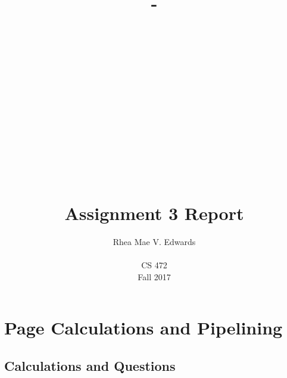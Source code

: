 \documentclass[letterpaper,10pt,onecolumn,compsoc]{IEEEtran}
\title{-\\ ~ \\ ~ \\ ~ \\ ~ \\ ~ \\ ~ \\ ~ \\ ~ \\ Assignment 3 Report}
\author{Rhea Mae V. Edwards\\ ~ \\CS 472\\Fall 2017}
\begin{document}

\maketitle

\newpage


\tableofcontents

\newpage

\section{Page Calculations and Pipelining}

\subsection{Calculations and Questions}
\end{document}
